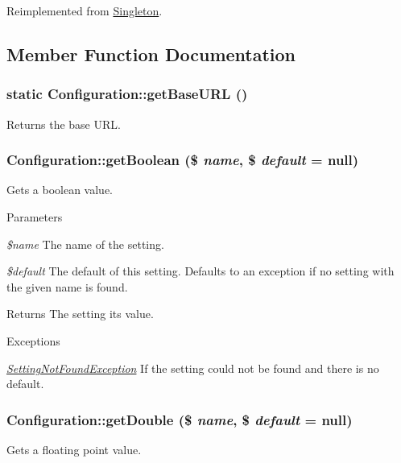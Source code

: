 Reimplemented from \hyperlink{classSingleton}{Singleton}.



\subsection{Member Function Documentation}
\hypertarget{classConfiguration_a9a1a49e746b5409d674183da01362444}{
\subsubsection[{getBaseURL}]{\setlength{\rightskip}{0pt plus 5cm}static Configuration::getBaseURL ()}}
\label{classConfiguration_a9a1a49e746b5409d674183da01362444}
Returns the base URL. \hypertarget{classConfiguration_a4afcc17b2a14fe90ca873fc7cbc38d16}{
\subsubsection[{getBoolean}]{\setlength{\rightskip}{0pt plus 5cm}Configuration::getBoolean (\$ {\em name}, \/  \$ {\em default} = {\ttfamily null})}}
\label{classConfiguration_a4afcc17b2a14fe90ca873fc7cbc38d16}
Gets a boolean value.


\begin{DoxyParams}{Parameters}
\item[{\em \$name}]The name of the setting. \item[{\em \$default}]The default of this setting. Defaults to an exception if no setting with the given name is found.\end{DoxyParams}
\begin{DoxyReturn}{Returns}
The setting its value.
\end{DoxyReturn}

\begin{DoxyExceptions}{Exceptions}
\item[{\em \hyperlink{classSettingNotFoundException}{SettingNotFoundException}}]If the setting could not be found and there is no default. \end{DoxyExceptions}
\hypertarget{classConfiguration_aadd8e90fd4915c74aabe8e88be9bfe58}{
\subsubsection[{getDouble}]{\setlength{\rightskip}{0pt plus 5cm}Configuration::getDouble (\$ {\em name}, \/  \$ {\em default} = {\ttfamily null})}}
\label{classConfiguration_aadd8e90fd4915c74aabe8e88be9bfe58}
Gets a floating point value.


